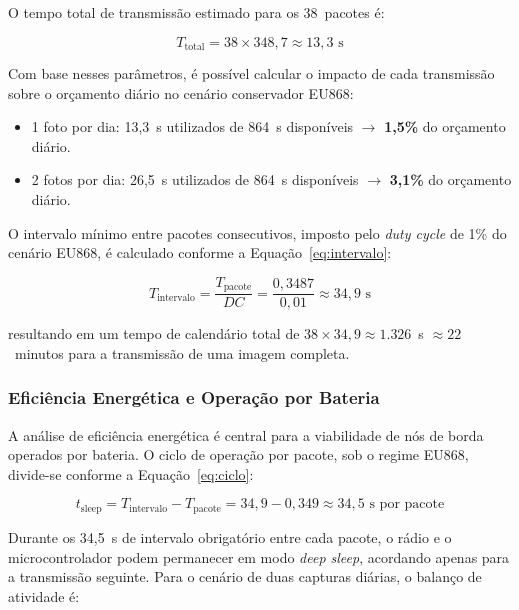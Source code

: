 O tempo total de transmissão estimado para os 38~pacotes é:
 
\begin{equation}
  \label{eq:ttotal}
  T_{\text{total}} = 38 \times 348{,}7 \approx 13{,}3 \text{ s}
\end{equation}
 
Com base nesses parâmetros, é possível calcular o impacto de cada transmissão sobre
o orçamento diário no cenário conservador EU868:
 
\begin{itemize}
  \item 1 foto por dia: 13,3~s utilizados de 864~s disponíveis $\rightarrow$ \textbf{1,5\%} do orçamento diário.
  \item 2 fotos por dia: 26,5~s utilizados de 864~s disponíveis $\rightarrow$ \textbf{3,1\%} do orçamento diário.
\end{itemize}
 
O intervalo mínimo entre pacotes consecutivos, imposto pelo \textit{duty cycle} de 1\%
do cenário EU868, é calculado conforme a Equação~\ref{eq:intervalo}:
 
\begin{equation}
  \label{eq:intervalo}
  T_{\text{intervalo}} = \frac{T_{\text{pacote}}}{DC} = \frac{0{,}3487}{0{,}01} \approx 34{,}9 \text{ s}
\end{equation}
 
\noindent resultando em um tempo de calendário total de $38 \times 34{,}9 \approx
1{.}326$~s $\approx 22$~minutos para a transmissão de uma imagem completa.
 
\subsubsection{Eficiência Energética e Operação por Bateria}

A análise de eficiência energética é central para a viabilidade de nós de borda
operados por bateria. O ciclo de operação por pacote, sob o regime EU868, divide-se
conforme a Equação~\ref{eq:ciclo}:

\begin{equation}
  \label{eq:ciclo}
  t_{\text{sleep}} = T_{\text{intervalo}} - T_{\text{pacote}} = 34{,}9 - 0{,}349 \approx 34{,}5 \text{ s por pacote}
\end{equation}

Durante os 34,5~s de intervalo obrigatório entre cada pacote, o rádio e o
microcontrolador podem permanecer em modo \textit{deep sleep}, acordando apenas para
a transmissão seguinte. Para o cenário de duas capturas diárias, o balanço de
atividade é:

